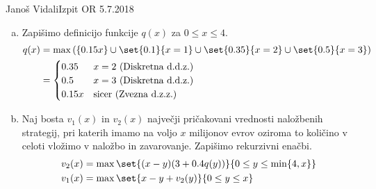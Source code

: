\begin{naloga}{Janoš Vidali}{Izpit OR 5.7.2018}
\begin{odgovor}
\begin{enumerate}[(a)]
\item Zapišimo definicijo funkcije $q(x)$ za $0 \le x \le 4$.
\begin{align*}
q(x) &= \max\left(\{0.15 x\} \cup \set{0.1}{x = 1} \cup \set{0.35}{x = 2} \cup \set{0.5}{x = 3}\right) \\
&= \begin{cases}
0.35   & x = 2 \text{ (Diskretna d.d.z.)} \\
0.5    & x = 3 \text{ (Diskretna d.d.z.)} \\
0.15 x & \text{sicer (Zvezna d.z.z.)}
\end{cases}
\end{align*}

\item Naj bosta $v_1(x)$ in $v_2(x)$
največji pričakovani vrednosti naložbenih strategij,
pri katerih imamo na voljo $x$ milijonov evrov
oziroma to količino v celoti vložimo v naložbo in zavarovanje.
Zapišimo rekurzivni enačbi.
\begin{align*}
v_2(x) &= \max\set{(x-y) (3 + 0.4 q(y))}{0 \le y \le \min\{4, x\}} \\
v_1(x) &= \max\set{x-y + v_2(y)}{0 \le y \le x}
\end{align*}


\end{enumerate}
\end{odgovor}
\end{naloga}
